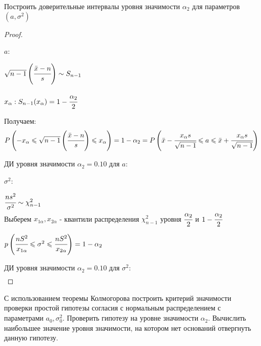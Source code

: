 \begin{problem}
	Построить доверительные интервалы уровня значимости $\alpha_2$ для параметров $(a, \sigma^2)$ 	
\end{problem}

\begin{proof}
	$ $
	
	$a$:

		$\sqrt{n-1}\left(\cfrac{\bar{x}-n}{s}\right)\sim S_{n-1}$ 
		
		$x_{\alpha}:S_{n-1}(x_{\alpha})=1-\cfrac{\alpha_2}{2}$

	Получаем:
	\begin{equation}
		P\left(-x_{\alpha}\leqslant\sqrt{n-1}\left(\cfrac{\bar{x}-n}{s}\right)\leqslant x_{\alpha}\right)=1-\alpha_2=P\left(\bar{x}-\cfrac{x_{\alpha}s}{\sqrt{n-1}}\leqslant a\leqslant\bar{x}+\cfrac{x_{\alpha}s}{\sqrt{n-1}}\right)
	\end{equation}
	
	ДИ уровня значимости $\alpha_2=0.10$ для $a$:
	\begin{equation}
		[1.638857; 6.315943]
	\end{equation}

	$\sigma^2$: 

		$\cfrac{ns^2}{\sigma^2}\sim \chi^2_{n-1}$ \\


	Выберем $x_{1\alpha}, x_{2\alpha}$ - квантили распределения $\chi^2_{n-1}$ уровня $\cfrac{\alpha_2}2$ и $1-\cfrac{\alpha_2}2$
	
	$p\left(\cfrac{nS^2}{x_{1\alpha}}\leqslant \sigma^2 \leqslant \cfrac{nS^2}{x_{2\alpha}}\right)=1-\alpha_2$ 
	
	ДИ уровня значимости $\alpha_2=0.10$ для $\sigma^2$: 
	\begin{align}
		[74.65098; 145.9534]
	\end{align}
\end{proof}


\begin{problem}
	С использованием теоремы Колмогорова построить критерий значимости проверки простой гипотезы согласия с нормальным распределением с параметрами $a_0, \sigma_0^2$. Проверить гипотезу на уровне значимости $\alpha_2$. Вычислить наибольшее значение уровня значимости, на котором нет оснований отвергнуть данную гипотезу.
\end{problem}

